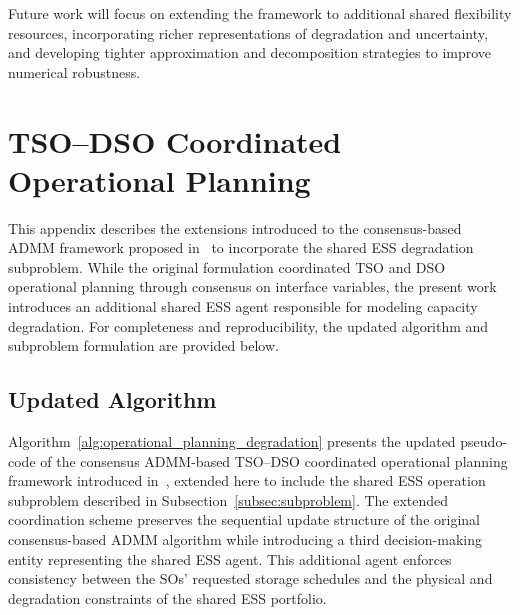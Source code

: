 \documentclass[preprint,12pt]{elsarticle}
\begin{document}
Future work will focus on extending the framework to additional shared flexibility resources, incorporating richer representations of degradation and uncertainty, and developing tighter approximation and decomposition strategies to improve numerical robustness.

\appendix


\section{TSO--DSO Coordinated Operational Planning}
\label{app:admm_updated}

This appendix describes the extensions introduced to the consensus-based ADMM framework proposed in~\cite{simoes_2023} to incorporate the shared ESS degradation subproblem. While the original formulation coordinated TSO and DSO operational planning through consensus on interface variables, the present work introduces an additional shared ESS agent responsible for modeling capacity degradation.
For completeness and reproducibility, the updated algorithm and subproblem formulation are provided below.

\subsection{Updated Algorithm}
\label{app:admm_updated_algorithm}

Algorithm~\ref{alg:operational_planning_degradation} presents the updated pseudo-code of the consensus ADMM-based TSO--DSO coordinated operational planning framework introduced in~\cite{simoes_2023}, extended here to include the shared ESS operation subproblem described in Subsection~\ref{subsec:subproblem}.
The extended coordination scheme preserves the sequential update structure of the original consensus-based ADMM algorithm while introducing a third decision-making entity representing the shared ESS agent. This additional agent enforces consistency between the SOs' requested storage schedules and the physical and degradation constraints of the shared ESS portfolio.
\end{document}
